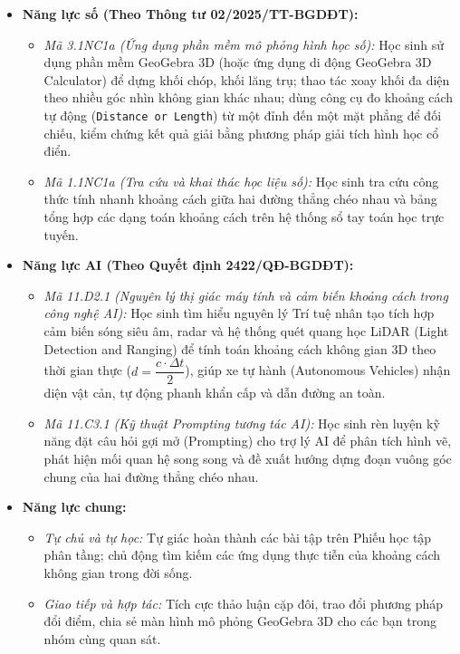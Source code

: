 \documentclass[12pt, a4paper]{article}
\begin{document}
\begin{itemize}[leftmargin=1.2cm]
    \item \textbf{Năng lực số (Theo Thông tư 02/2025/TT-BGDĐT):}
    \begin{itemize}[leftmargin=0.6cm]
        \item \textit{Mã 3.1NC1a (Ứng dụng phần mềm mô phỏng hình học số):} Học sinh sử dụng phần mềm GeoGebra 3D (hoặc ứng dụng di động GeoGebra 3D Calculator) để dựng khối chóp, khối lăng trụ; thao tác xoay khối đa diện theo nhiều góc nhìn không gian khác nhau; dùng công cụ đo khoảng cách tự động (\texttt{Distance or Length}) từ một đỉnh đến một mặt phẳng để đối chiếu, kiểm chứng kết quả giải bằng phương pháp giải tích hình học cổ điển.
        \item \textit{Mã 1.1NC1a (Tra cứu và khai thác học liệu số):} Học sinh tra cứu công thức tính nhanh khoảng cách giữa hai đường thẳng chéo nhau và bảng tổng hợp các dạng toán khoảng cách trên hệ thống sổ tay toán học trực tuyến.
    \end{itemize}

    \item \textbf{Năng lực AI (Theo Quyết định 2422/QĐ-BGDĐT):}
    \begin{itemize}[leftmargin=0.6cm]
        \item \textit{Mã 11.D2.1 (Nguyên lý thị giác máy tính và cảm biến khoảng cách trong công nghệ AI):} Học sinh tìm hiểu nguyên lý Trí tuệ nhân tạo tích hợp cảm biến sóng siêu âm, radar và hệ thống quét quang học LiDAR (Light Detection and Ranging) để tính toán khoảng cách không gian 3D theo thời gian thực ($d = \dfrac{c \cdot \Delta t}{2}$), giúp xe tự hành (Autonomous Vehicles) nhận diện vật cản, tự động phanh khẩn cấp và dẫn đường an toàn.
        \item \textit{Mã 11.C3.1 (Kỹ thuật Prompting tương tác AI):} Học sinh rèn luyện kỹ năng đặt câu hỏi gợi mở (Prompting) cho trợ lý AI để phân tích hình vẽ, phát hiện mối quan hệ song song và đề xuất hướng dựng đoạn vuông góc chung của hai đường thẳng chéo nhau.
    \end{itemize}

    \item \textbf{Năng lực chung:}
    \begin{itemize}[leftmargin=0.6cm]
        \item \textit{Tự chủ và tự học:} Tự giác hoàn thành các bài tập trên Phiếu học tập phân tầng; chủ động tìm kiếm các ứng dụng thực tiễn của khoảng cách không gian trong đời sống.
        \item \textit{Giao tiếp và hợp tác:} Tích cực thảo luận cặp đôi, trao đổi phương pháp đổi điểm, chia sẻ màn hình mô phỏng GeoGebra 3D cho các bạn trong nhóm cùng quan sát.
    \end{itemize}
\end{itemize}
\end{document}
